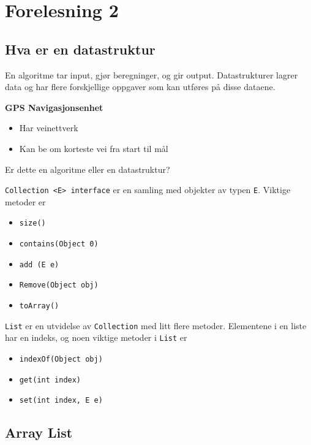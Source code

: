 \documentclass[twocolumn]{article}
\begin{document}
    \section{Forelesning 2}

    \subsection{Hva er en datastruktur}
    En algoritme tar input, gjør beregninger, og gir output. Datastrukturer lagrer data og har flere forskjellige oppgaver som kan utføres på disse dataene.

\begin{eg}
    \textbf{GPS Navigasjonsenhet}

    \begin{itemize}
        \item Har veinettverk
        \item Kan be om korteste vei fra start til mål
    \end{itemize}

    Er dette en algoritme eller en datastruktur?
\end{eg}

\verb!Collection <E> interface! er en samling med objekter av typen \verb!E!. Viktige metoder er

\begin{itemize}
    \item \verb!size()!
    \item \verb!contains(Object 0)!
    \item \verb!add (E e)!
    \item \verb!Remove(Object obj)!
    \item \verb!toArray()!
\end{itemize}

\verb!List! er en utvidelse av \verb!Collection! med litt flere metoder. Elementene i en liste har en indeks, og noen viktige metoder i \verb!List! er

\begin{itemize}
    \item \verb!indexOf(Object obj)!
    \item \verb!get(int index)!
    \item \verb!set(int index, E e)!
\end{itemize}

\subsection{Array List}
\end{document}
